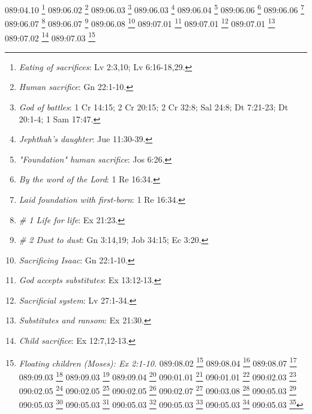 {{{{{{{{{{{{{{{{089:04.10 \footnote{\textit{Eating of sacrifices}: Lv 2:3,10; Lv 6:16-18,29.}
089:06.02 \footnote{\textit{Human sacrifice}: Gn 22:1-10.}
089:06.03 \footnote{\textit{God of battles}: 1 Cr 14:15; 2 Cr 20:15; 2 Cr 32:8; Sal 24:8; Dt 7:21-23; Dt 20:1-4; 1 Sam 17:47.}
089:06.03 \footnote{\textit{Jephthah's daughter}: Jue 11:30-39.}
089:06.04 \footnote{\textit{"Foundation" human sacrifice}: Jos 6:26.}
089:06.06 \footnote{\textit{By the word of the Lord}: 1 Re 16:34.}
089:06.06 \footnote{\textit{Laid foundation with first-born}: 1 Re 16:34.}
089:06.07 \footnote{\textit{# 1 Life for life}: Ex 21:23.}
089:06.07 \footnote{\textit{# 2 Dust to dust}: Gn 3:14,19; Job 34:15; Ec 3:20.}
089:06.08 \footnote{\textit{Sacrificing Isaac}: Gn 22:1-10.}
089:07.01 \footnote{\textit{God accepts substitutes}: Ex 13:12-13.}
089:07.01 \footnote{\textit{Sacrificial system}: Lv 27:1-34.}
089:07.01 \footnote{\textit{Substitutes and ransom}: Ex 21:30.}
089:07.02 \footnote{\textit{Child sacrifice}: Ex 12:7,12-13.}
089:07.03 \footnote{\textit{Floating children (Moses): Ex 2:1-10.}
089:08.02 \footnote{\textit{Circumcision}: Gn 17:10-14.}
089:08.04 \footnote{\textit{Covenant replaces fear}: Gn 6:18; Gn 9:9,11; Gn 17:4,7-10,21.}
089:08.07 \footnote{\textit{Prayer of a just man}: 2 Cr 30:27; Stg 5:16.}
089:09.03 \footnote{\textit{Blood of everlasting covenant}: Heb 13:20.}
089:09.03 \footnote{\textit{Jesus seen as a human sacrifice}: 1 Co 5:7; Ef 5:2; Col 1:14; Tit 2:14; Heb 9:11-28; Heb 10:1-20; Heb 13:12; 1 P 1:18-19.}
089:09.04 \footnote{\textit{Cult of the Sacrament}: 1 Co 11:23-27.}
090:01.01 \footnote{\textit{Seers}: 2 Re 17:13; 1 Cr 29:29; 1 Sam 9:8-11,18-19; 2 Sam 15:27.}
090:01.01 \footnote{\textit{Shamans (priests)}: Ex 2:16; Ex 28:1-43; Ex 29:4-9,29; Nm 18:1-10.}
090:02.03 \footnote{\textit{Witchcraft}: Ex 22:18; Dt 18:10-12; 1 Sam 15:23.}
090:02.05 \footnote{\textit{Astrology}: Is 47:13; Dn 2:2; Am 5:26; Mt 2:7,9-10.}
090:02.05 \footnote{\textit{Shamanesses}: 1 Sam 28:7-19.}
090:02.05 \footnote{\textit{When you hear sound of wind}: 1 Cr 14:15; 2 Sam 5:24.}
090:02.07 \footnote{\textit{Lucky stars}: Mt 2:2.}
090:03.08 \footnote{\textit{Arrows of the Almighty}: Job 6:4; Sal 38:1-2.}
090:05.03 \footnote{\textit{"Amen" as ritual}: Nm 5:22.}
090:05.03 \footnote{\textit{"Selah" as ritual}: Sal 3:2.}
090:05.03 \footnote{\textit{Cleanse congregation's sins}: Lv 4:13-21.}
090:05.03 \footnote{\textit{Cleanse individual sins}: Lv 5:1-13.}
090:05.03 \footnote{\textit{Cleanse leprosy}: Lv 14:2-11.}
090:05.03 \footnote{\textit{Cleanse trespasses}: Lv 6:8-18.}
090:05.03 \footnote{\textit{Purify (Red Heifer ritual)}: Nm 19:1-22.}
}}}}}}}}}}}}}}}}}
